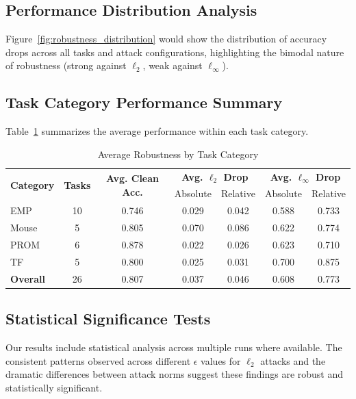 \documentclass{article} %
\begin{document}
\subsection{Performance Distribution Analysis}

Figure~\ref{fig:robustness_distribution} would show the distribution of accuracy drops across all tasks and attack configurations, highlighting the bimodal nature of robustness (strong against $\ell_2$, weak against $\ell_\infty$).

\subsection{Task Category Performance Summary}

Table~\ref{tab:category_summary} summarizes the average performance within each task category.

\begin{table}[h]
\centering
\caption{Average Robustness by Task Category}
\label{tab:category_summary}
\begin{tabular}{lcccccc}
\toprule
\multirow{2}{*}{\textbf{Category}} & \multirow{2}{*}{\textbf{Tasks}} & \multirow{2}{*}{\textbf{Avg. Clean Acc.}} & \multicolumn{2}{c}{\textbf{Avg. $\ell_2$ Drop}} & \multicolumn{2}{c}{\textbf{Avg. $\ell_\infty$ Drop}} \\
\cmidrule{4-5} \cmidrule{6-7}
& & & Absolute & Relative & Absolute & Relative \\
\midrule
EMP & 10 & 0.746 & 0.029 & 0.042 & 0.588 & 0.733 \\
Mouse & 5 & 0.805 & 0.070 & 0.086 & 0.622 & 0.774 \\
PROM & 6 & 0.878 & 0.022 & 0.026 & 0.623 & 0.710 \\
TF & 5 & 0.800 & 0.025 & 0.031 & 0.700 & 0.875 \\
\midrule
\textbf{Overall} & 26 & 0.807 & 0.037 & 0.046 & 0.608 & 0.773 \\
\bottomrule
\end{tabular}
\end{table}

\subsection{Statistical Significance Tests}

Our results include statistical analysis across multiple runs where available. The consistent patterns observed across different $\epsilon$ values for $\ell_2$ attacks and the dramatic differences between attack norms suggest these findings are robust and statistically significant.
\end{document}
